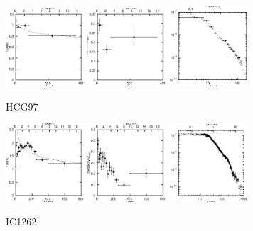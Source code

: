 \documentclass[structabstract]{aa}
\begin{document}
\begin{figure}[h]
   \centering
   \includegraphics[width=0.26\textwidth]{tprofile_hcg97.eps}
   \includegraphics[width=0.26\textwidth]{zprofile_hcg97.eps}
   \includegraphics[width=0.26\textwidth]{sbps_hcg97.eps}
   \caption{HCG97}
   \label{fig:tprofhcg97}%
\end{figure}
\begin{figure}[h]
   \centering
   \includegraphics[width=0.26\textwidth]{tprofile_ic1262.eps}
   \includegraphics[width=0.26\textwidth]{zprofile_ic1262.eps}
   \includegraphics[width=0.26\textwidth]{sbps_ic1262.eps}
   \caption{IC1262}
   \label{fig:tprofic1262}%
\end{figure}
\end{document}
